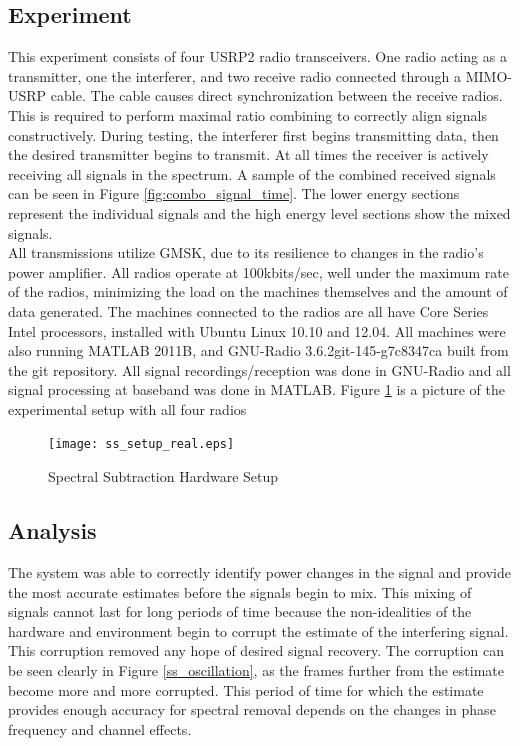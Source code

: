 \subsection{Experiment}

This experiment consists of four USRP2 radio transceivers.  One radio acting as a transmitter, one the interferer, and two receive radio connected through a MIMO-USRP cable.  The cable causes direct synchronization between the receive radios.  This is required to perform maximal ratio combining to correctly align signals constructively.  During testing, the interferer first begins transmitting data, then the desired transmitter begins to transmit.  At all times the receiver is actively receiving all signals in the spectrum.  A sample of the combined received signals can be seen in Figure \ref{fig:combo_signal_time}.  The lower energy sections represent the individual signals and the high energy level sections show the mixed signals.\\


All transmissions utilize GMSK, due to its resilience to changes in the radio's power amplifier.  All radios operate at 100kbits/sec, well under the maximum rate of the radios, minimizing the load on the machines themselves and the amount of data generated.  The machines connected to the radios are all have Core Series Intel processors, installed with Ubuntu Linux 10.10 and 12.04.  All machines were also running MATLAB 2011B, and GNU-Radio 3.6.2git-145-g7c8347ca built from the git repository.  All signal recordings/reception was done in GNU-Radio and all signal processing at baseband was done in MATLAB.  Figure \ref{ss_setup_real} is a picture of the experimental setup with all four radios

\begin{figure}
\centering
\texttt{[image: ss\_setup\_real.eps]}
\caption{Spectral Subtraction Hardware Setup}
\label{ss_setup_real}
\end{figure}

\subsection{Analysis}

The system was able to correctly identify power changes in the signal and provide the most accurate estimates before the signals begin to mix.  This mixing of signals cannot last for long periods of time because the non-idealities of the hardware and environment begin to corrupt the estimate of the interfering signal.  This corruption removed any hope of desired signal recovery.  The corruption can be seen clearly in Figure \ref{ss_oscillation}, as the frames further from the estimate become more and more corrupted.  This period of time for which the estimate provides enough accuracy for spectral removal depends on the changes in phase frequency and channel effects.\\

